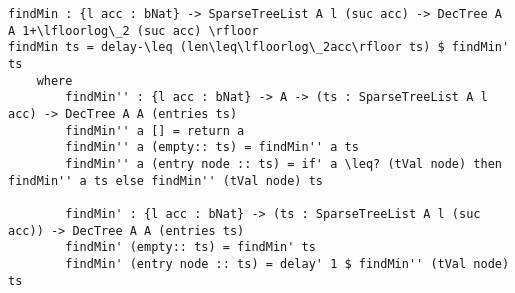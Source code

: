 \begin{lstlisting}[caption={Finding the minimum element},label={lst:appendix:heap:min}]
findMin : {l acc : bNat} -> SparseTreeList A l (suc acc) -> DecTree A A 1+\lfloorlog\_2 (suc acc) \rfloor
findMin ts = delay-\leq (len\leq\lfloorlog\_2acc\rfloor ts) $ findMin' ts
    where
        findMin'' : {l acc : bNat} -> A -> (ts : SparseTreeList A l acc) -> DecTree A A (entries ts)
        findMin'' a [] = return a
        findMin'' a (empty:: ts) = findMin'' a ts
        findMin'' a (entry node :: ts) = if' a \leq? (tVal node) then findMin'' a ts else findMin'' (tVal node) ts

        findMin' : {l acc : bNat} -> (ts : SparseTreeList A l (suc acc)) -> DecTree A A (entries ts)
        findMin' (empty:: ts) = findMin' ts
        findMin' (entry node :: ts) = delay' 1 $ findMin'' (tVal node) ts
\end{lstlisting}
